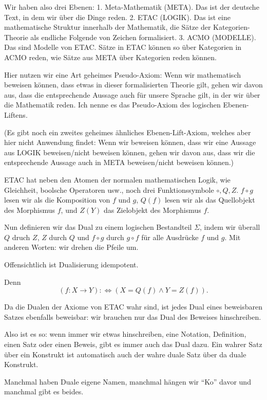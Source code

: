 \documentclass[a4paper]{amsart}
\theoremstyle{definition}
\begin{document}
Wir haben also drei Ebenen: 1. Meta-Mathematik (META). Das ist der deutsche Text, in dem wir über die Dinge reden. 2. ETAC (LOGIK). Das ist eine mathematische Struktur innerhalb der Mathematik, die Sätze der Kategorien-Theorie als endliche Folgende von Zeichen formalisiert. 3. ACMO (MODELLE). Das sind Modelle von ETAC. Sätze in ETAC können so über Kategorien in ACMO reden, wie Sätze aus META über Kategorien reden können.

Hier nutzen wir eine Art geheimes Pseudo-Axiom: Wenn wir mathematisch beweisen können, dass etwas in dieser formalisierten Theorie gilt, gehen wir davon aus, dass die entsprechende Aussage auch für unsere Sprache gilt, in der wir über die Mathematik reden. Ich nenne es das Pseudo-Axiom des logischen Ebenen-Liftens.

(Es gibt noch ein zweites geheimes ähnliches Ebenen-Lift-Axiom, welches aber hier nicht Anwendung findet: Wenn wir beweisen können, dass wir eine Aussage aus LOGIK beweisen/nicht beweisen können, gehen wir davon aus, dass wir die entsprechende Aussage auch in META beweisen/nicht beweisen können.)

ETAC hat neben den Atomen der normalen mathematischen Logik, wie Gleichheit, boolsche Operatoren usw., noch drei Funktionssymbole $\circ, Q, Z$. $f \circ g$ lesen wir als die Komposition von $f$ und $g$, $Q(f)$ lesen wir als das Quellobjekt des Morphismus $f$, und  $Z(Y)$ das Zielobjekt des Morphismus $f$.

Nun definieren wir das Dual zu einem logischen Bestandteil $\Sigma$, indem wir überall $Q$ druch $Z$, $Z$ durch $Q$ und $f \circ g$ durch $g \circ f$ für alle Ausdrücke $f$ und $g$. Mit anderen Worten: wir drehen die Pfeile um.

Offensichtlich ist Dualisierung idempotent.

Denn
\begin{equation}
   (f \colon X \to Y) :\Leftrightarrow (X=Q(f) \land Y=Z(f)).
\end{equation} 

Da die Dualen der Axiome von ETAC wahr sind, ist jedes Dual eines beweisbaren Satzes ebenfalls beweisbar: wir brauchen nur das Dual des Beweises hinschreiben.

Also ist es so: wenn immer wir etwas hinschreiben, eine Notation, Definition, einen Satz oder einen Beweis, gibt es immer auch das Dual dazu. Ein wahrer Satz über ein Konstrukt ist automatisch auch der wahre duale Satz über da duale Konstrukt.

Manchmal haben Duale eigene Namen, manchmal hängen wir "`Ko"' davor und manchmal gibt es beides.
\end{document}

